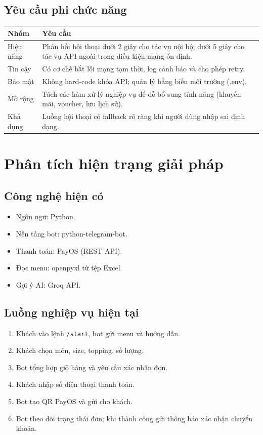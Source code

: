 \documentclass[12pt,a4paper]{article}
\begin{document}
\subsection{Yêu cầu phi chức năng}
\begin{longtable}{p{1.8cm}p{10.5cm}}
\toprule
\textbf{Nhóm} & \textbf{Yêu cầu} \\
\midrule
Hiệu năng & Phản hồi hội thoại dưới 2 giây cho tác vụ nội bộ; dưới 5 giây cho tác vụ API ngoài trong điều kiện mạng ổn định. \\
Tin cậy & Có cơ chế bắt lỗi mạng tạm thời, log cảnh báo và cho phép retry. \\
Bảo mật & Không hard-code khóa API; quản lý bằng biến môi trường (.env). \\
Mở rộng & Tách các hàm xử lý nghiệp vụ để dễ bổ sung tính năng (khuyến mãi, voucher, lưu lịch sử). \\
Khả dụng & Luồng hội thoại có fallback rõ ràng khi người dùng nhập sai định dạng. \\
\bottomrule
\end{longtable}

\section{Phân tích hiện trạng giải pháp}
\subsection{Công nghệ hiện có}
\begin{itemize}
    \item Ngôn ngữ: Python.
    \item Nền tảng bot: python-telegram-bot.
    \item Thanh toán: PayOS (REST API).
    \item Đọc menu: openpyxl từ tệp Excel.
    \item Gợi ý AI: Groq API.
\end{itemize}

\subsection{Luồng nghiệp vụ hiện tại}
\begin{enumerate}
    \item Khách vào lệnh \texttt{/start}, bot gửi menu và hướng dẫn.
    \item Khách chọn món, size, topping, số lượng.
    \item Bot tổng hợp giỏ hàng và yêu cầu xác nhận đơn.
    \item Khách nhập số điện thoại thanh toán.
    \item Bot tạo QR PayOS và gửi cho khách.
    \item Bot theo dõi trạng thái đơn; khi thành công gửi thông báo xác nhận chuyển khoản.
\end{enumerate}
\end{document}
